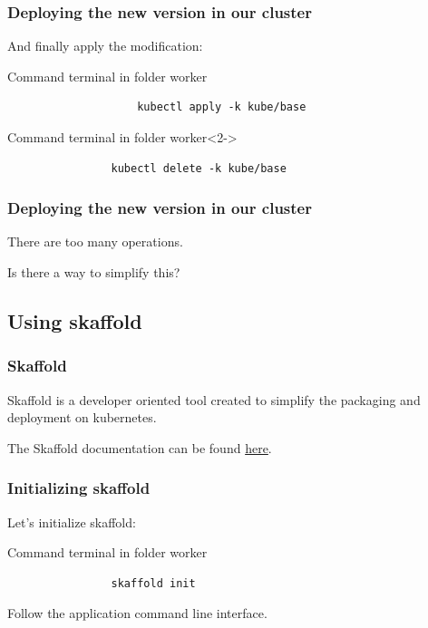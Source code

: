 	\begin{frame}[fragile]
		\frametitle{Deploying the new version in our cluster}
			
		And finally apply the modification:
		\begin{block}{Command terminal in folder worker}
			\begin{small}
					\begin{verbatim}
					kubectl apply -k kube/base
				\end{verbatim}
			\end{small}
		\end{block}
		
		\bigskip
		
		\begin{block}{Command terminal in folder worker}<2->
			\begin{verbatim}
				kubectl delete -k kube/base
			\end{verbatim}
		\end{block}
	\end{frame}
	
	\begin{frame}
		\frametitle{Deploying the new version in our cluster}
		
		There are too many operations.
		
		\bigskip
		Is there a way to simplify this?
	\end{frame}
	
\subsection{Using skaffold}	
	
	\begin{frame}
		\frametitle{Skaffold}
		
		Skaffold is a developer oriented tool created to simplify the packaging and deployment on kubernetes.
		
		\medskip
		The Skaffold documentation can be found \href{https://github.com/GoogleContainerTools/skaffold}{here}.

	\end{frame}
	
	\begin{frame}[fragile]
		\frametitle{Initializing skaffold}
		
		Let's initialize skaffold:
		\begin{block}{Command terminal in folder worker}
			\begin{verbatim}
				skaffold init
			\end{verbatim}
			Follow the application command line interface.
		\end{block}
	\end{frame}
	
